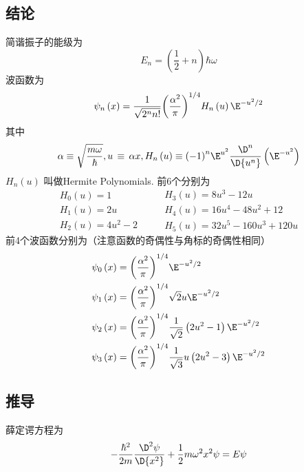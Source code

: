 
\subsection{结论}

简谐振子的能级为
\begin{equation}
{E_n} = \left( {\frac{1}{2} + n} \right)\hbar \omega 
\end{equation}
波函数为
\begin{equation}
{\psi_n}\left( x \right) = \frac{1}{\sqrt {{2^n}n!} }{\left( {\frac{\alpha ^2}{\pi }} \right)^{1/4}}{H_n}\left( u \right){\E^{ - {u^2}/2}}
\end{equation}
其中
\begin{equation}
\alpha  \equiv \sqrt {\frac{m\omega }{\hbar }} , u\, \equiv \,\alpha x, {H_n}\left( u \right) \equiv {\left( { - 1} \right)^n}{\E^{u^2}}\frac{\D^n}{\D{u^n}}\left( {\E^{ - {u^2}}} \right)
\end{equation}
${H_n}\left( u \right)$ 叫做Hermite Polynomials. 前6个分别为
\begin{equation}
\begin{array}{l}
{H_0}\left( u \right) = 1\\
{H_1}\left( u \right) = 2u\\
{H_2}\left( u \right) = 4{u^2} - 2
\end{array}
\qquad
\begin{array}{l}
{H_3}\left( u \right) = 8{u^3} - 12u\\
{H_4}\left( u \right) = 16{u^4} - 48{u^2} + 12\\
{H_5}\left( u \right) = 32{u^5} - 160{u^3} + 120u
\end{array}
\end{equation}
前4个波函数分别为（注意函数的奇偶性与角标的奇偶性相同）
\begin{equation}\begin{aligned}
{\psi_0}\left( x \right) &= {\left( {\frac{\alpha ^2}{\pi }} \right)^{1/4}}{\E^{ - {u^2}/2}}\\
{\psi_1}\left( x \right) &= {\left( {\frac{\alpha ^2}{\pi }} \right)^{1/4}}\sqrt 2 u{\E^{ - {u^2}/2}} \\
{\psi_2}\left( x \right) &= {\left( {\frac{\alpha ^2}{\pi }} \right)^{1/4}}\frac{1}{\sqrt 2 }\left( {2{u^2} - 1} \right){\E^{ - {u^2}/2}}\\
{\psi_3}\left( x \right) &= {\left( {\frac{\alpha ^2}{\pi }} \right)^{1/4}}\frac{1}{\sqrt 3 }u\left( {2{u^2} - 3} \right){\E^{ - {u^2}/2}}
\end{aligned}\end{equation}
\subsection{推导}%

薛定谔方程为
\begin{equation}
- \frac{\hbar ^2}{2m}\frac{{\D^2}\psi }{\D{x^2}} + \frac{1}{2}m{\omega ^2}{x^2}\psi  = E\psi
\end{equation}